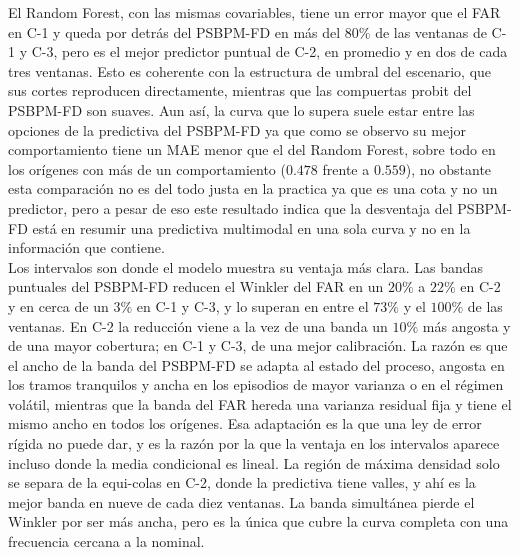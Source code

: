 El Random Forest, con las mismas covariables, tiene un error mayor que el FAR en C-1 y queda por detrás del PSBPM-FD en más del $80\%$ de las ventanas de C-1 y C-3, pero es el mejor predictor puntual de C-2, en promedio y en dos de cada tres ventanas. Esto es coherente con la estructura de umbral del escenario, que sus cortes reproducen directamente, mientras que las compuertas probit del PSBPM-FD son suaves. Aun así, la curva que lo supera suele estar entre las opciones de la predictiva del PSBPM-FD ya que como se observo su mejor comportamiento tiene un MAE menor que el del Random Forest, sobre todo en los orígenes con más de un comportamiento ($0.478$ frente a $0.559$), no obstante esta comparación no es del todo justa en la practica ya que es una cota y no un predictor, pero a pesar de eso este resultado indica que la desventaja del PSBPM-FD está en resumir una predictiva multimodal en una sola curva y no en la información que contiene.\\

Los intervalos son donde el modelo muestra su ventaja más clara. Las bandas puntuales del PSBPM-FD reducen el Winkler del FAR en un $20\%$ a $22\%$ en C-2 y en cerca de un $3\%$ en C-1 y C-3, y lo superan en entre el $73\%$ y el $100\%$ de las ventanas. En C-2 la reducción viene a la vez de una banda un $10\%$ más angosta y de una mayor cobertura; en C-1 y C-3, de una mejor calibración. La razón es que el ancho de la banda del PSBPM-FD se adapta al estado del proceso, angosta en los tramos tranquilos y ancha en los episodios de mayor varianza o en el régimen volátil, mientras que la banda del FAR hereda una varianza residual fija y tiene el mismo ancho en todos los orígenes. Esa adaptación es la que una ley de error rígida no puede dar, y es la razón por la que la ventaja en los intervalos aparece incluso donde la media condicional es lineal. La región de máxima densidad solo se separa de la equi-colas en C-2, donde la predictiva tiene valles, y ahí es la mejor banda en nueve de cada diez ventanas. La banda simultánea pierde el Winkler por ser más ancha, pero es la única que cubre la curva completa con una frecuencia cercana a la nominal.\\

